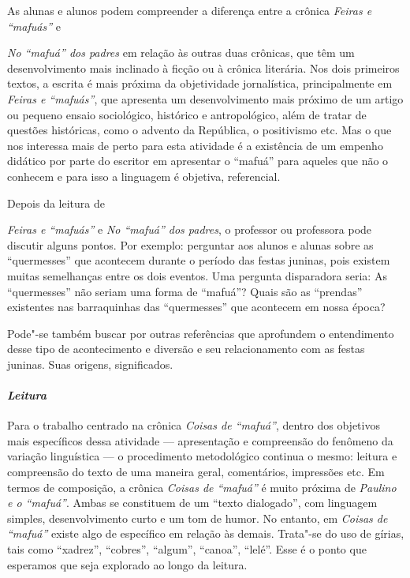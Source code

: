 \documentclass[11pt]{extarticle}
\begin{document}
As alunas e alunos podem compreender a diferença entre a crônica
{\textit{Feiras e ``mafuás''}} e {\textit{\emph{No ``mafuá'' dos
padres}} em relação às outras duas crônicas, que têm um desenvolvimento
mais inclinado à ficção ou à crônica literária. Nos dois primeiros
textos, a escrita é mais próxima da objetividade jornalística,
principalmente em {\textit{Feiras e ``mafuás''}}, que apresenta um
desenvolvimento mais próximo de um artigo ou pequeno ensaio sociológico,
histórico e antropológico, além de tratar de questões históricas, como o
advento da República, o positivismo etc. Mas o que nos interessa mais
de perto para esta atividade é a existência de um empenho didático por
parte do escritor em apresentar o ``mafuá'' para aqueles que não
o conhecem e para isso a linguagem é objetiva, referencial.





Depois da leitura de {\textit{\emph{Feiras e ``mafuás''}} e
{\textit{No ``mafuá'' dos padres}}, o professor ou professora pode
discutir alguns pontos. Por exemplo: perguntar aos alunos e alunas sobre
as ``quermesses'' que acontecem durante o período das festas juninas,
pois existem muitas semelhanças entre os dois eventos. Uma pergunta
disparadora seria: As ``quermesses'' não seriam uma forma de
``mafuá''? Quais são as ``prendas'' existentes nas barraquinhas
das ``quermesses'' que acontecem em nossa época?

Pode"-se também buscar por outras referências que aprofundem o
entendimento desse tipo de acontecimento e diversão e seu relacionamento
com as festas juninas. Suas origens, significados.

\paragraph{\textit{Leitura}}


Para o trabalho centrado na crônica {\textit{Coisas de ``mafuá''}},
dentro dos objetivos mais específicos dessa atividade --- apresentação e
compreensão do fenômeno da variação linguística --- o procedimento
metodológico continua o mesmo: leitura e compreensão do texto de uma
maneira geral, comentários, impressões etc. Em termos de composição, a
crônica {\textit{Coisas de ``mafuá''}} é muito próxima de
{\textit{Paulino e o ``mafuá''}}. Ambas se constituem de um ``texto
dialogado'', com linguagem simples, desenvolvimento curto e um tom de
humor. No entanto, em {\textit{Coisas de ``mafuá''}} existe algo de
específico em relação às demais. Trata"-se do uso de gírias, tais como
``xadrez'', ``cobres'', ``algum'', ``canoa'', ``lelé''. Esse é o ponto
que esperamos que seja explorado ao longo da leitura.

}}
\end{document}

